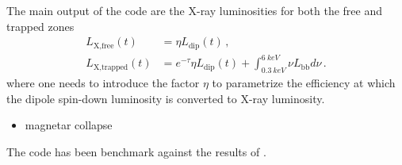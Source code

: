 \documentclass[11pt]{article} %
\newcommand{\tx}[1]{\textrm{#1}}
\newcommand{\Ldip}{\ensuremath{L_\tx{dip}}}
\newcommand{\Lbb}{\ensuremath{L_\tx{bb}}}
\begin{document}
The main output of the code are the X-ray luminosities for both the
free and trapped zones
\begin{align}
  L_\tx{X,free}(t) &= \eta \Ldip(t) \,,\\
  L_\tx{X,trapped}(t) &= e^{-\tau} \eta \Ldip(t)
  + \int_{\SI{0.3}{keV}}^{\SI{6}{keV}} \nu \Lbb d \nu
  \,.
\end{align}
where one needs to introduce the factor $\eta$ to parametrize the
efficiency at which the dipole spin-down luminosity is converted to
X-ray luminosity.

\begin{itemize}
\item magnetar collapse
\end{itemize}

The code has been benchmark against the results of
\citet{gompertz2014}.




\end{document}
